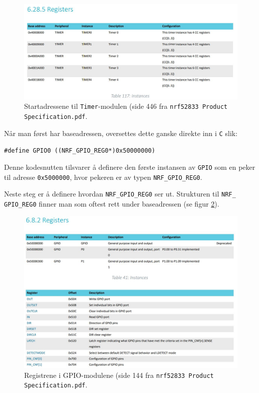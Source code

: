 \begin{figure}[ht]
    \centering
    \includegraphics[scale=0.61]{Main/figures/timer_memory.JPG}
    \caption{Startadressene til \texttt{Timer}-modulen (side 446 fra \texttt{nrf52833 Product Specification.pdf}.}
    \label{fig:app-timerl}
\end{figure}

Når man først har baseadressen, oversettes dette ganske direkte inn i \verb|C| slik:

\verb|#define GPIO0 ((NRF_GPIO_REG0*)0x50000000)|

Denne kodesnutten tilsvarer å definere den første instansen av \verb|GPIO| som en peker til adresse \verb|0x5000000|, hvor pekeren er av typen \verb|NRF_GPIO_REG0|. 

Neste steg er å definere hvordan \verb|NRF_GPIO_REG0| ser ut. Strukturen til \verb|NRF_ GPIO_REG0| finner man som oftest rett under baseadressen (se figur \ref{fig:app-memory-struct}).

\begin{figure}[ht]
    \centering
    \includegraphics[scale=0.61]{Main/figures/memory_stuff_gpio.JPG}
    \caption{Registrene i GPIO-modulene (side 144 fra \texttt{nrf52833 Product Specification.pdf}.}
    \label{fig:app-memory-struct}
\end{figure}

